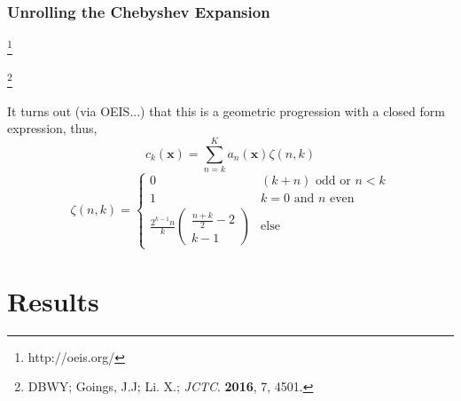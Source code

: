 \documentclass{beamer}
\newcommand\blfootnote[1]{%
  \begingroup
  \renewcommand\thefootnote{}\footnote{#1}%
  \addtocounter{footnote}{-1}%
  \endgroup
}
\begin{document}
\begin{frame}
\frametitle{Unrolling the Chebyshev Expansion}
\blfootnote{http://oeis.org/}
\blfootnote{DBWY; Goings, J.J; Li. X.; \emph{JCTC}. \textbf{2016}, 7, 4501.}

It turns out (via OEIS...) that this is a geometric progression with a closed form expression,
thus,
\begin{equation*}
c_k(\mathbf{x}) = \sum_{n = k}^K a_n(\mathbf{x}) \zeta(n,k)
\end{equation*}
\begin{equation*}
\zeta(n,k) = \begin{cases}
0 & (k+n)\text{ odd or } n < k \\
1 & k = 0 \text{ and } n \text{ even}\\
\frac{2^{k-1}n}{k} \begin{pmatrix} \frac{n+k}{2} - 2 \\ k - 1\end{pmatrix} & \text{else}
\end{cases}
\end{equation*}

\end{frame}

\section{Results}
\end{document}
